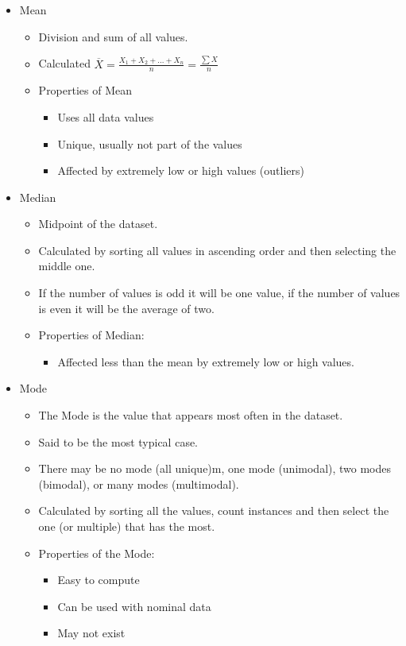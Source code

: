 \documentclass{article}
\begin{document}
\begin{itemize}
	\item Mean
		\begin{itemize}
			\item Division and sum of all values.
			\item Calculated $\overline{X} = \frac{X_1+X_2+...+X_n}{n}=\frac{\sum X}{n}$
			\item Properties of Mean
			\begin{itemize}
				\item Uses all data values
				\item Unique, usually not part of the values
				\item Affected by extremely low or high values (outliers)
			\end{itemize}
		\end{itemize}
	\item Median
	\begin{itemize}
		\item Midpoint of the dataset.
		\item Calculated by sorting all values in ascending order and then selecting the middle one.
		\item If the number of values is odd it will be one value, if the number of values is even it will be the average of two.
		\item Properties of Median:
		\begin{itemize}
			\item Affected less than the mean by extremely low or high values.
		\end{itemize}
	\end{itemize}
	\item Mode
	\begin{itemize}
		\item The Mode is the value that appears most often in the dataset. 
		\item Said to be the most typical case. 
		\item There may be no mode (all unique)m, one mode (unimodal), two modes (bimodal), or many modes (multimodal).
		\item Calculated by sorting all the values, count instances and then select the one (or multiple) that has the most.
		\item Properties of the Mode:
		\begin{itemize}
			\item Easy to compute
			\item Can be used with nominal data
			\item May not exist

\end{itemize}
\end{itemize}
\end{itemize}
\end{document}
